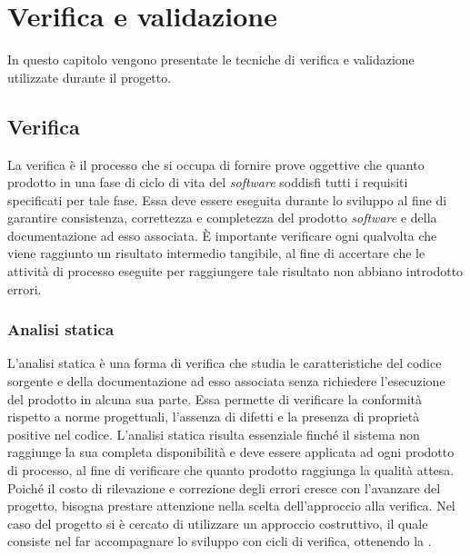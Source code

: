 
\chapter{Verifica e validazione}
\label{cap:verifica-validazione}

In questo capitolo vengono presentate le tecniche di verifica e validazione utilizzate durante il progetto.

\section{Verifica}

La verifica è il processo che si occupa di fornire prove oggettive che quanto prodotto in una fase di ciclo di vita del \textit{software} soddisfi tutti i requisiti specificati per tale fase. Essa deve essere eseguita durante lo sviluppo al fine di garantire consistenza, correttezza e completezza del prodotto \textit{software} e della documentazione ad esso associata. È importante verificare ogni qualvolta che viene raggiunto un risultato intermedio tangibile, al fine di accertare che le attività di processo eseguite per raggiungere tale risultato non abbiano introdotto errori.

\subsection{Analisi statica}

L'analisi statica è una forma di verifica che studia le caratteristiche del codice sorgente e della documentazione ad esso associata senza richiedere l'esecuzione del prodotto in alcuna sua parte. Essa permette di verificare la conformità rispetto a norme progettuali, l'assenza di difetti e la presenza di proprietà positive nel codice. L'analisi statica risulta essenziale finché il sistema non raggiunge la sua completa disponibilità e deve essere applicata ad ogni prodotto di processo, al fine di verificare che quanto prodotto raggiunga la qualità attesa. Poiché il costo di rilevazione e correzione degli errori cresce con l'avanzare del progetto, bisogna prestare attenzione nella scelta dell'approccio alla verifica. Nel caso del progetto si è cercato di utilizzare un approccio costruttivo, il quale consiste nel far accompagnare lo sviluppo con cicli di verifica, ottenendo la .

